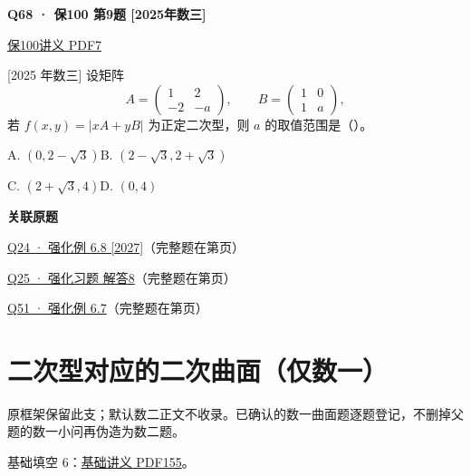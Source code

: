 \documentclass[UTF8,fontset=fandol,11pt,a4paper]{ctexart}
\newcommand{\source}[1]{{\footnotesize\color{Muted}#1\par}}
\newcommand{\qtitle}[2]{\par\needspace{5\baselineskip}\hypertarget{#1}{}\label{#1}\textbf{#2}\par}
\begin{document}
\begin{minipage}{\linewidth}
\qtitle{S-09}{Q68 · 保100 第9题 [2025年数三]}
\source{\href{file:///Users/skyintelligence/Desktop/\%E5\%BE\%97\%E8\%AF\%BB\%E4\%B8\%AA\%E7\%A0\%94-\%E5\%8C\%97\%E5\%A4\%A7\%E8\%BD\%AF\%E5\%BE\%AE/\%E6\%95\%B0\%E5\%AD\%A6\%20150/02\_\%E4\%B8\%93\%E9\%A1\%B9\%E5\%88\%B7\%E9\%A2\%98\_\%E4\%BF\%9D100/\%E7\%BA\%BF\%E6\%80\%A7\%E4\%BB\%A3\%E6\%95\%B0/\%E7\%BA\%BF\%E6\%80\%A7\%E4\%BB\%A3\%E6\%95\%B0\%E4\%B8\%93\%E9\%A1\%B9\%E5\%88\%B7\%E9\%A2\%98\%E8\%AF\%BE14-\%E4\%BA\%8C\%E6\%AC\%A1\%E5\%9E\%8B\%20\%E8\%AE\%B2\%E4\%B9\%89.pdf\#page=7}{保100讲义 PDF7}}
[2025 年数三] 设矩阵\[A=\begin{pmatrix}1&2\\-2&-a\end{pmatrix},\qquad B=\begin{pmatrix}1&0\\1&a\end{pmatrix},\]若 \(f(x,y)=\lvert xA+yB\rvert\) 为正定二次型，则 \(a\) 的取值范围是（\hspace{1em}）。\par A. \((0,2-\sqrt{3})\)\qquad B. \((2-\sqrt{3},2+\sqrt{3})\)\par C. \((2+\sqrt{3},4)\)\qquad D. \((0,4)\)
\end{minipage}\par\vspace{7mm}
\textbf{关联原题}\par
\hyperlink{R-EX-08}{Q24 · 强化例 6.8 [2027]}（完整题在第\pageref*{R-EX-08}页）\par
\hyperlink{R-LONG-08}{Q25 · 强化习题 解答8}（完整题在第\pageref*{R-LONG-08}页）\par
\hyperlink{R-EX-07}{Q51 · 强化例 6.7}（完整题在第\pageref*{R-EX-07}页）\par
\clearpage\section*{二次型对应的二次曲面（仅数一）}
原框架保留此支；默认数二正文不收录。已确认的数一曲面题逐题登记，不删掉父题的数一小问再伪造为数二题。\par
基础填空 6：\href{file:///Users/skyintelligence/Desktop/\%E5\%BE\%97\%E8\%AF\%BB\%E4\%B8\%AA\%E7\%A0\%94-\%E5\%8C\%97\%E5\%A4\%A7\%E8\%BD\%AF\%E5\%BE\%AE/\%E6\%95\%B0\%E5\%AD\%A6\%20150/\%E8\%AE\%B2\%E4\%B9\%89/\%E3\%80\%90\%E4\%B8\%80\%E9\%AB\%98\%E6\%95\%B0Kira\%E3\%80\%9127\%E8\%80\%83\%E7\%A0\%94\%E7\%BA\%BF\%E4\%BB\%A3\%E5\%9F\%BA\%E7\%A1\%80\%E8\%AE\%B2\%E4\%B9\%89\%26\%E4\%B9\%A0\%E9\%A2\%98-\%E7\%94\%B5\%E5\%AD\%90\%E7\%89\%88.pdf\#page=155}{基础讲义 PDF155}。\par
\end{document}
